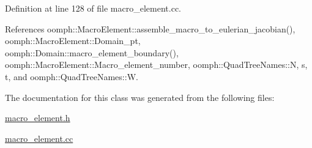 Definition at line 128 of file macro\+\_\+element.\+cc.



References oomph\+::\+Macro\+Element\+::assemble\+\_\+macro\+\_\+to\+\_\+eulerian\+\_\+jacobian(), oomph\+::\+Macro\+Element\+::\+Domain\+\_\+pt, oomph\+::\+Domain\+::macro\+\_\+element\+\_\+boundary(), oomph\+::\+Macro\+Element\+::\+Macro\+\_\+element\+\_\+number, oomph\+::\+Quad\+Tree\+Names\+::N, s, t, and oomph\+::\+Quad\+Tree\+Names\+::W.



The documentation for this class was generated from the following files\+:\begin{DoxyCompactItemize}
\item 
\hyperlink{macro__element_8h}{macro\+\_\+element.\+h}\item 
\hyperlink{macro__element_8cc}{macro\+\_\+element.\+cc}\end{DoxyCompactItemize}
